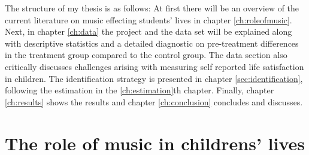 \documentclass[a4, 12pt]{article}
\begin{document}
The structure of my thesis is as follows: At first there will be an overview of the current literature on music effecting students' lives in chapter \ref{ch:roleofmusic}. Next, in chapter \ref{ch:data} the project and the data set will be explained along with descriptive statistics and a detailed diagnostic on pre-treatment differences in the treatment group compared to the control group. The data section also critically discusses challenges arising with measuring self reported life satisfaction in children. The identification strategy is presented in chapter \ref{sec:identification}, following the estimation in the \ref{ch:estimation}th chapter. Finally, chapter \ref{ch:results} shows the results and chapter \ref{ch:conclusion} concludes and discusses.

\clearpage

\hypertarget{the-role-of-music-in-childrens-lives}{%
\section{The role of music in childrens' lives}\label{the-role-of-music-in-childrens-lives}}
\end{document}
